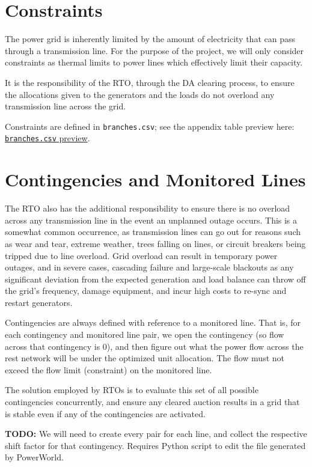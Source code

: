 \documentclass[11pt]{article}
\begin{document}
\section{Constraints}
The power grid is inherently limited by the amount of electricity that can pass through a transmission line. For the purpose of the project, we will only consider constraints as thermal limits to power lines which effectively limit their capacity.

It is the responsibility of the RTO, through the DA clearing process, to ensure the allocations given to the generators and the loads do not overload any transmission line across the grid.

Constraints are defined in \texttt{branches.csv}; see the appendix table preview here: \hyperref[app:branches-preview]{\texttt{branches.csv} preview}.

\section{Contingencies and Monitored Lines}
The RTO also has the additional responsibility to ensure there is no overload across any transmission line in the event an unplanned outage occurs. This is a somewhat common occurrence, as transmission lines can go out for reasons such as wear and tear, extreme weather, trees falling on lines, or circuit breakers being tripped due to line overload. Grid overload can result in temporary power outages, and in severe cases, cascading failure and large-scale blackouts as any significant deviation from the expected generation and load balance can throw off the grid's frequency, damage equipment, and incur high costs to re-sync and restart generators.

Contingencies are always defined with reference to a monitored line. That is, for each contingency and monitored line pair, we open the contingency (so flow across that contingency is 0), and then figure out what the power flow across the rest network will be under the optimized unit allocation. The flow must not exceed the flow limit (constraint) on the monitored line.

The solution employed by RTOs is to evaluate this set of all possible contingencies concurrently, and ensure any cleared auction results in a grid that is stable even if any of the contingencies are activated.

\textbf{TODO: } We will need to create every pair for each line, and collect the respective shift factor for that contingency. Requires Python script to edit the file generated by PowerWorld.
\end{document}
